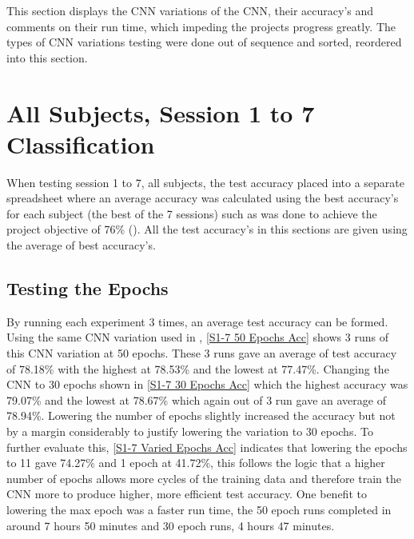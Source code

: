 This section displays the CNN variations of the CNN, their accuracy's and comments on their run time, which impeding the projects progress greatly. The types of CNN variations testing were done out of sequence and sorted, reordered into this section.

\section{All Subjects, Session 1 to 7 Classification}
\label{All Subjects, Session 1 to 7 Classification Section}

When testing session 1 to 7, all subjects, the test accuracy placed into a separate spreadsheet where an average accuracy was calculated using the best accuracy's for each subject (the best of the 7 sessions) such as was done to achieve the project objective of 76\% (\cite{PalaniPaper}). All the test accuracy's in this sections are given using the average of best accuracy's.

\subsection{Testing the Epochs}
\label{All Subjects, 1 to 7 TestEpoch}

By running each experiment 3 times, an average test accuracy can be formed. Using the same CNN variation used in \cite{PalaniPaper}, \cref{S1-7 50 Epochs Acc} shows 3 runs of this CNN variation at 50 epochs. These 3 runs gave an average of test accuracy of 78.18\% with the highest at 78.53\% and the lowest at 77.47\%. Changing the CNN to 30 epochs shown in \cref{S1-7 30 Epochs Acc} which the highest accuracy was 79.07\% and the lowest at 78.67\% which again out of 3 run gave an average of 78.94\%. Lowering the number of epochs slightly increased the accuracy but not by a margin considerably to justify lowering the variation to 30 epochs. To further evaluate this, \cref{S1-7 Varied Epochs Acc} indicates that lowering the epochs to 11 gave 74.27\% and 1 epoch at 41.72\%, this follows the logic that a higher number of epochs allows more cycles of the training data and therefore train the CNN more to produce higher, more efficient test accuracy. One benefit to lowering the max epoch was a faster run time, the 50 epoch runs completed in around 7 hours 50 minutes and 30 epoch runs, 4 hours 47 minutes. 

